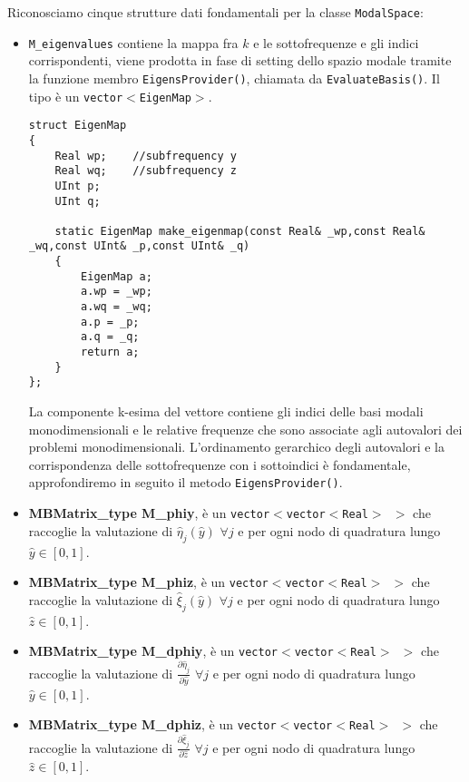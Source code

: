 Riconosciamo cinque strutture dati fondamentali per la classe \texttt{ModalSpace}:

\begin{itemize}

\item \texttt{M\_eigenvalues} contiene la mappa fra $k$ e le sottofrequenze e gli indici corrispondenti, viene prodotta in fase di setting dello 
spazio modale tramite la funzione membro \texttt{EigensProvider()}, chiamata da \texttt{EvaluateBasis()}. Il tipo \`e un \texttt{vector$<
$EigenMap$>$}.
 
\begin{lstlisting}[style = general]
struct EigenMap
{
	Real wp;	//subfrequency y
	Real wq;	//subfrequency z
	UInt p;
	UInt q;
	
	static EigenMap make_eigenmap(const Real& _wp,const Real& _wq,const UInt& _p,const UInt& _q)
	{
		EigenMap a;
		a.wp = _wp;
		a.wq = _wq;
		a.p = _p;
		a.q = _q;
		return a;	
	}
};
\end{lstlisting}
La componente k-esima del vettore contiene gli indici delle basi modali monodimensionali e le relative frequenze che sono associate agli autovalori
dei problemi monodimensionali.
L'ordinamento gerarchico degli autovalori e la corrispondenza delle sottofrequenze con i sottoindici \`e fondamentale, approfondiremo in seguito 
il metodo \texttt{EigensProvider()}.

\item \textbf{MBMatrix\_type M\_phiy}, \`e un \texttt{vector$<$vector$<$Real$>$ $>$} che raccoglie la valutazione di $\hat{\eta}_j(\hat{y})$ $\forall j$ e per ogni nodo di quadratura lungo $\hat{y}\in[0,1]$.

\item \textbf{MBMatrix\_type M\_phiz}, \`e un \texttt{vector$<$vector$<$Real$>$ $>$} che raccoglie la valutazione di $\hat{\xi}_j(\hat{y})$ $\forall j$ e per ogni nodo di quadratura lungo $\hat{z}\in[0,1]$.

\item \textbf{MBMatrix\_type M\_dphiy}, \`e un \texttt{vector$<$vector$<$Real$>$ $>$} che raccoglie la valutazione di $\frac{\partial\hat{\eta}_j}{\partial 	\hat{y}}$ $\forall j$ e per ogni nodo di quadratura lungo $\hat{y}\in[0,1]$.

\item \textbf{MBMatrix\_type M\_dphiz}, \`e un \texttt{vector$<$vector$<$Real$>$ $>$} che raccoglie la valutazione di $\frac{\partial\hat{\xi}_j}{\partial 	\hat{z}}$ $\forall j$ e per ogni nodo di quadratura lungo $\hat{z}\in[0,1]$.

\end{itemize}
